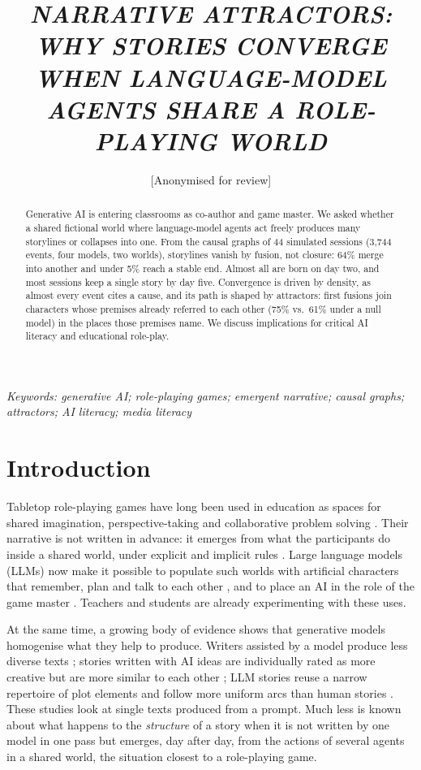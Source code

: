 \documentclass[12pt]{article}
\title{\textbf{\textit{NARRATIVE ATTRACTORS: WHY STORIES CONVERGE WHEN LANGUAGE-MODEL AGENTS SHARE A ROLE-PLAYING WORLD}}}
\author{[Anonymised for review]}
\date{}
\begin{document}
\maketitle
\thispagestyle{fancy}

\begin{abstract}
\noindent
Generative AI is entering classrooms as co-author and game master. We asked
whether a shared fictional world where language-model agents act freely
produces many storylines or collapses into one. From the causal graphs of 44
simulated sessions (3,744 events, four models, two worlds), storylines vanish
by fusion, not closure: 64\% merge into another and under 5\% reach a stable
end. Almost all are born on day two, and most sessions keep a single story by
day five. Convergence is driven by density, as almost every event cites a
cause, and its path is shaped by attractors: first fusions join characters
whose premises already referred to each other (75\% vs.\ 61\% under a null
model) in the places those premises name. We discuss implications for
critical AI literacy and educational role-play.
\end{abstract}

\noindent\textit{Keywords: generative AI; role-playing games; emergent narrative; causal graphs; attractors; AI literacy; media literacy}

\section{Introduction}

Tabletop role-playing games have long been used in education as spaces for
shared imagination, perspective-taking and collaborative problem solving
\parencite{fine1983,bowman2010,daniau2016}. Their narrative is not written in
advance: it emerges from what the participants do inside a shared world,
under explicit and implicit rules \parencite{montola2008}. Large language
models (LLMs) now make it possible to populate such worlds with artificial
characters that remember, plan and talk to each other
\parencite{park2023}, and to place an AI in the role of the game master
\parencite{callisonburch2022}. Teachers and students are already
experimenting with these uses.

At the same time, a growing body of evidence shows that generative models
homogenise what they help to produce. Writers assisted by a model produce
less diverse texts \parencite{padmakumar2024}; stories written with AI ideas
are individually rated as more creative but are more similar to each other
\parencite{doshi2024}; LLM stories reuse a narrow repertoire of plot elements
\parencite{xu2025} and follow more uniform arcs than human stories
\parencite{tian2024,begus2024}. These studies look at single texts produced
from a prompt. Much less is known about what happens to the
\emph{structure} of a story when it is not written by one model in one pass
but emerges, day after day, from the actions of several agents in a shared
world, the situation closest to a role-playing game.
\end{document}

